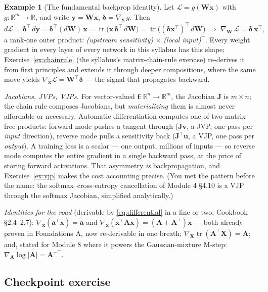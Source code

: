 \documentclass[11pt]{article}
\numberwithin{equation}{section}
\theoremstyle{plain}
\theoremstyle{definition}
\newtheorem{example}[theorem]{Example}
\theoremstyle{remark}
\newcounter{exercise}
\DeclareMathOperator{\tr}{tr}
\newcommand{\R}{\mathbb{R}}
\newcommand{\x}{\bm{x}}
\newcommand{\T}{\top}
\begin{document}
\begin{example}[The fundamental backprop identity]\label{ex:fundbp}
Let $\mathcal{L} = g(\bm{W}\x)$ with $g: \R^m \to \R$, and write $\bm{y} = \bm{W}\x$, $\bm{\delta} = \nabla_{\bm y}\, g$. Then
\[
d\mathcal{L} = \bm{\delta}^\T\, d\bm{y} = \bm{\delta}^\T (d\bm{W})\, \x
= \tr\big( \x\, \bm{\delta}^\T\, d\bm{W} \big)
= \tr\big( (\bm{\delta}\x^\T)^\T\, d\bm{W} \big)
\;\Longrightarrow\;
\nabla_{\bm W}\, \mathcal{L} = \bm{\delta}\, \x^\T,
\]
a rank-one outer product: \emph{(upstream sensitivity)} $\times$ \emph{(local input)}$^\T$. Every weight gradient in every layer of every network in this syllabus has this shape; Exercise~\ref{ex:chainrule} (the syllabus's matrix-chain-rule exercise) re-derives it from first principles and extends it through deeper compositions, where the same move yields $\nabla_{\x} \mathcal{L} = \bm{W}^\T \bm{\delta}$ --- the signal that propagates backward.
\end{example}

\emph{Jacobians, JVPs, VJPs.} For vector-valued $\bm f: \R^n \to \R^m$, the Jacobian $\bm J$ is $m \times n$; the chain rule composes Jacobians, but \emph{materializing} them is almost never affordable or necessary. Automatic differentiation computes one of two matrix-free products: forward mode pushes a tangent through ($\bm J \bm v$, a JVP, one pass per \emph{input} direction), reverse mode pulls a sensitivity back ($\bm J^\T \bm u$, a VJP, one pass per \emph{output}). A training loss is a scalar --- one output, millions of inputs --- so reverse mode computes the entire gradient in a single backward pass, at the price of storing forward activations. That asymmetry \emph{is} backpropagation, and Exercise~\ref{ex:vjp} makes the cost accounting precise. (You met the pattern before the name: the softmax--cross-entropy cancellation of Module 4 \S4.10 is a VJP through the softmax Jacobian, simplified analytically.)

\emph{Identities for the road} (derivable by \eqref{eq:differential} in a line or two; Cookbook \S2.4--2.7): $\nabla_{\x}(\bm a^\T \x) = \bm a$ and $\nabla_{\x}(\x^\T\bm A\x) = (\bm A + \bm A^\T)\x$ --- both already proven in Foundations A, now re-derivable in one breath; $\nabla_{\bm X} \tr(\bm{A}^\T\bm{X}) = \bm{A}$; and, stated for Module 8 where it powers the Gaussian-mixture M-step: $\nabla_{\bm A} \log|\bm A| = \bm A^{-\T}$.


\subsection*{Checkpoint exercise}
\end{document}

